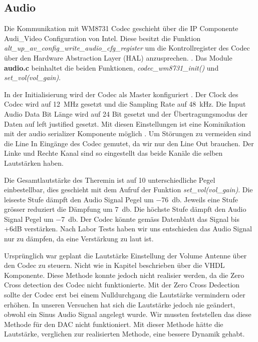 \subsection{Audio}\label{subsec:audio}

Die Kommunikation mit WM8731 Codec geschieht über die IP Componente Audi\_Video Configuration von Intel. Diese besitzt die Funktion 
\textit{alt\_up\_av\_config\_write\_audio\_cfg\_register} um die Kontrollregister des Codec über den Hardware Abstraction Layer (HAL) anzusprechen. .
Das Module \textbf{audio.c} beinhaltet die beiden Funktionen, \textit{codec\_wm8731\_init()} und \textit{set\_vol(vol\_gain)}. 

In der Initialisierung wird der Codec als Master konfiguriert . Der Clock des Codec wird auf \SI{12}{MHz} gesetzt und die Sampling Rate auf \SI{48}{kHz}. Die Input Audio Data Bit Länge wird auf 24 Bit gesetzt und der Übertragungsmodus der Daten auf left justified gesetzt. Mit diesen Einstellungen ist eine Kominikation mit der audio serializer Komponente möglich .
Um Störungen zu vermeiden sind die Line In Eingänge des Codec gemutet, da wir nur den Line Out brauchen. Der Linke und Rechte Kanal sind so eingestellt das beide Kanäle die selben Lautstärken haben\cite{codec}. 

Die Gesamtlautstärke des Theremin ist auf 10 unterschiedliche Pegel einbestellbar, dies geschieht mit dem Aufruf der Funktion \textit{set\_vol(vol\_gain)}. Die leiseste Stufe dämpft den Audio Signal Pegel um \SI{-76}{db}. Jeweils eine Stufe grösser reduziert die Dämpfung um \SI{7}{db}. Die höchste Stufe dämpft den Audio Signal Pegel um \SI{-7}{db}. Der Codec könnte gemäss Datenblatt das Signal bis +6dB verstärken. Nach Labor Tests haben wir uns entschieden das Audio Signal nur zu dämpfen, da eine Verstärkung zu laut ist.


Ursprünglich war geplant die Lautstärke Einstellung der Volume Antenne über den Codec zu steuern. Nicht wie in Kapitel  beschrieben über die VHDL Komponente. Diese Methode konnte jedoch nicht realisier werden, da die Zero Cross detection des Codec nicht funktionierte. Mit der Zero Cross Dedection sollte der Codec erst bei einem Nulldurchgang die Lautstärke vermindern oder erhöhen. In unseren Versuchen hat sich die Lautstärke jedoch nie geändert, obwohl ein Sinus Audio Signal angelegt wurde. Wir mussten feststellen das diese Methode für den DAC nicht funktioniert. Mit dieser Methode hätte die Lautstärke, verglichen zur realisierten Methode, eine bessere Dynamik gehabt. 
